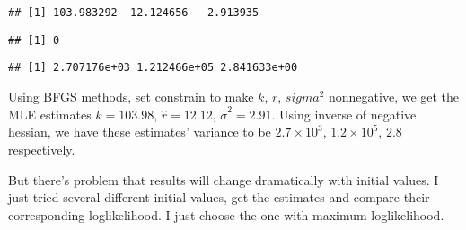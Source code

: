\documentclass[]{book}
\newenvironment{Shaded}{\begin{snugshade}}{\end{snugshade}}
\newcommand{\KeywordTok}[1]{\textcolor[rgb]{0.13,0.29,0.53}{\textbf{#1}}}
\newcommand{\OperatorTok}[1]{\textcolor[rgb]{0.81,0.36,0.00}{\textbf{#1}}}
\newcommand{\NormalTok}[1]{#1}
\theoremstyle{definition}
\theoremstyle{definition}
\theoremstyle{definition}
\theoremstyle{remark}
\begin{document}
\begin{verbatim}
## [1] 103.983292  12.124656   2.913935
\end{verbatim}

\begin{Shaded}
\end{Shaded}

\begin{verbatim}
## [1] 0
\end{verbatim}

\begin{Shaded}
\end{Shaded}

\begin{verbatim}
## [1] 2.707176e+03 1.212466e+05 2.841633e+00
\end{verbatim}

Using BFGS methods, set constrain to make \(k\), \(r\), \(sigma^2\)
nonnegative, we get the MLE estimates \(\hat{k} = 103.98\),
\(\hat{r} = 12.12\), \(\hat{\sigma}^2 = 2.91\). Using inverse of
negative hessian, we have these estimates' variance to be
\(2.7\times 10^3\), \(1.2\times 10^5\), \(2.8\) respectively.

But there's problem that results will change dramatically with initial
values. I just tried several different initial values, get the estimates
and compare their corresponding loglikelihood. I just choose the one
with maximum loglikelihood.


\end{document}
